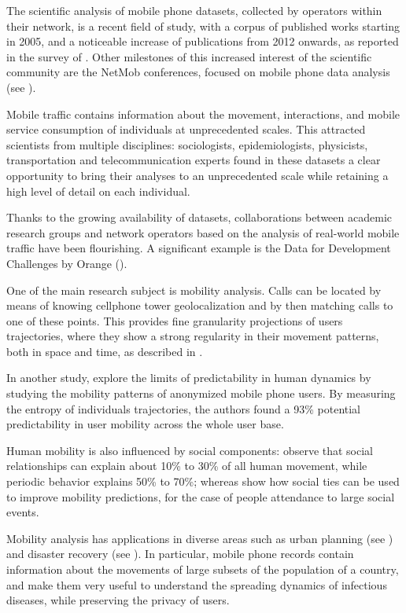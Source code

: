 The scientific analysis of mobile phone datasets, collected by operators within their network, is a recent field of study, with a corpus of published works starting in 2005, and a noticeable increase of publications from 2012 onwards, as reported in the survey of \cite{naboulsi2015mobile}. Other milestones of this increased interest of the scientific community are the NetMob conferences, focused on mobile phone data analysis (see \cite{netmob}).

Mobile traffic contains information about the movement, interactions, and mobile service consumption of individuals at unprecedented scales.
This attracted scientists from multiple disciplines:
sociologists, epidemiologists, physicists, transportation and telecommunication experts
found in these datasets a clear opportunity to bring their analyses to an unprecedented scale while retaining a high level of detail on each individual.

Thanks to the growing availability of datasets, collaborations between academic research groups and network operators based on the analysis of real-world mobile traffic have been flourishing. A significant example is the Data for Development Challenges by Orange (\cite{d4d}).

One of the main research subject is mobility analysis.
Calls can be located by means of knowing cellphone tower geolocalization and by then matching calls to one of these points.
This provides fine granularity projections of users trajectories, where they show a strong regularity in their movement patterns,
both in space and time, as described in \cite{gonzalez2008understanding}.

In another study, \cite{song2010limits} explore the limits of predictability in human dynamics by studying the mobility patterns of anonymized mobile phone users.
By measuring the entropy of individuals trajectories, the authors found a 93\% potential predictability in user mobility across the whole user base.

Human mobility is also influenced by social components: \cite{cho2011friendship} observe that social relationships
can explain about 10\% to 30\% of all human movement, while periodic
behavior explains 50\% to 70\%; whereas \cite{ponieman2016mobility} show how social ties can be used to improve mobility predictions, for the case of people attendance to large social events.

Mobility analysis has applications in diverse areas such as urban planning (see \cite{wang2012understanding}) and disaster recovery (see \cite{lu2012predictability}).
In particular, mobile phone records contain information about the movements of large subsets of the population of a country, and make them very useful to understand the spreading dynamics of infectious diseases, while preserving the privacy of users.

